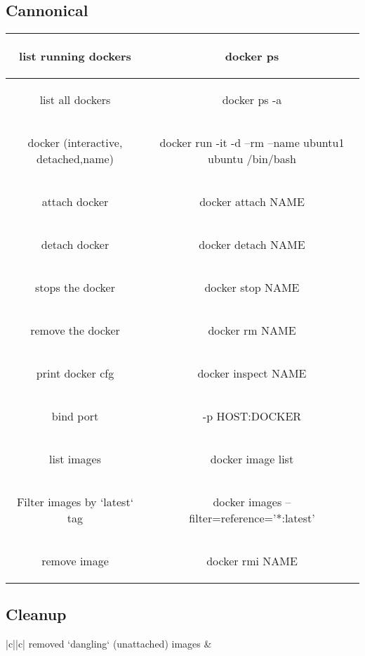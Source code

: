 
\section*{}
\subsection*{Cannonical}
\begin{tabular}{|c||c|} %
    \hline
    list running dockers & \begin{bash}
docker ps
    \end{bash} \\ \hline
    list all dockers & \begin{bash}
docker ps -a
    \end{bash} \\ \hline
    docker (interactive, detached,name) & \begin{bash}
docker run -it -d --rm --name ubuntu1 ubuntu /bin/bash
    \end{bash} \\ \hline
    attach docker & \begin{bash}
docker attach NAME
    \end{bash} \\ \hline
    detach docker & \begin{bash}
docker detach NAME
    \end{bash} \\ \hline
    stops the docker & \begin{bash}
docker stop NAME
    \end{bash} \\ \hline
    remove the docker & \begin{bash}
docker rm NAME
    \end{bash} \\ \hline
    print docker cfg & \begin{bash}
docker inspect NAME
    \end{bash} \\ \hline
bind port & \begin{bash}
        -p HOST:DOCKER
    \end{bash} \\ \hline
list images & \begin{bash}
        docker image list
    \end{bash} \\ \hline
Filter images by `latest` tag & \begin{bash}
        docker images --filter=reference='*:latest'
    \end{bash} \\ \hline
remove image & \begin{bash}
        docker rmi NAME
    \end{bash} \\ \hline
\end{tabular}

\subsection*{Cleanup}
\begin{tabular}{|c||c|} %
    \hline
    \textdollar removed `dangling` (unattached) images &  \\ \hline
\end{tabular}
